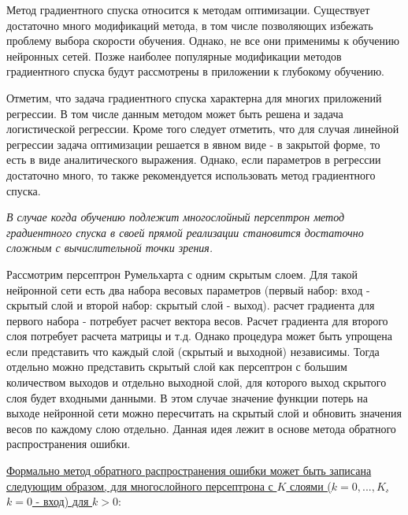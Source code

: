 \documentclass[12pt]{article}
\begin{document}
\begin{sloppypar}
Метод градиентного спуска относится к методам оптимизации. Существует достаточно много модификаций метода, в том числе позволяющих избежать проблему выбора скорости обучения. Однако, не все они применимы к обучению нейронных сетей. Позже наиболее популярные модификации методов градиентного спуска будут рассмотрены в приложении к глубокому обучению.

Отметим, что задача градиентного спуска характерна для многих приложений регрессии. В том числе данным методом может быть решена и задача логистической регрессии. Кроме того следует отметить, что для случая линейной регрессии задача оптимизации решается в явном виде - в закрытой форме, то есть в виде аналитического выражения. Однако, если параметров в регрессии достаточно много, то также рекомендуется использовать метод градиентного спуска.

\textit{
В случае когда обучению подлежит многослойный персептрон метод градиентного спуска в своей прямой реализации становится достаточно сложным с вычислительной точки зрения.
} 

Рассмотрим персептрон Румельхарта с одним скрытым слоем. Для такой нейронной сети есть два набора весовых параметров (первый набор: вход - скрытый слой и второй набор: скрытый слой - выход). расчет градиента для первого набора - потребует расчет вектора весов. Расчет градиента для второго слоя потребует расчета матрицы и т.д. Однако процедура может быть упрощена если представить что каждый слой (скрытый и выходной) независимы. Тогда отдельно можно представить скрытый слой как персептрон с большим количеством выходов и отдельно выходной слой, для которого выход скрытого слоя будет входными данными. В этом случае значение функции потерь на выходе нейронной сети можно пересчитать на скрытый слой и обновить значения весов по каждому слою отдельно. Данная идея лежит в основе метода обратного распространения ошибки. 

\uline{Формально метод  обратного распространения ошибки может быть записана следующим образом, для многослойного персептрона с $K$ слоями ($k=0,...,K$, $k=0$ - вход) для $k>0$}:


\end{sloppypar}
\end{document}
